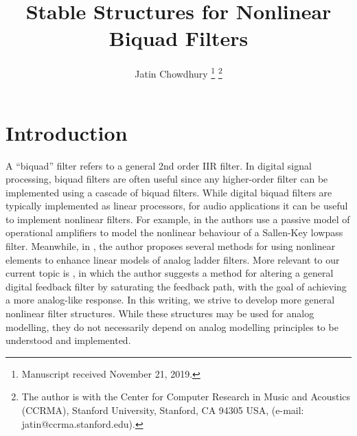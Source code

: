 \documentclass{IEEEtran}
\begin{document}
\title{Stable Structures for Nonlinear Biquad Filters}

\author{Jatin Chowdhury
\thanks{Manuscript received November 21, 2019.}
\thanks{The author is with 
the Center for Computer Research in Music and Acoustics (CCRMA),
Stanford University, Stanford, CA 
94305 USA, (e-mail: jatin@ccrma.stanford.edu).}}



\maketitle
\IEEEdisplaynontitleabstractindextext

\section{Introduction}
A ``biquad'' filter refers to a general 2nd order IIR filter.
In digital signal processing, biquad filters are often useful
since any higher-order filter can be implemented using a cascade
of biquad filters. While digital biquad filters are typically implemented
as linear processors, for audio applications it can be useful to
implement nonlinear filters. For example, in \cite{SKF} the authors
use a passive model of operational amplifiers to model the nonlinear
behaviour of a Sallen-Key lowpass filter. Meanwhile, in \cite{Vadim},
the author proposes several methods for using nonlinear elements
to enhance linear models of analog ladder filters. More relevant to
our current topic is \cite{Rossum1992MakingDF}, in which the author
suggests a method for altering a general digital feedback filter
by saturating the feedback path, with the goal of achieving a more
analog-like response. In this writing, we strive
to develop more general nonlinear filter structures. While these structures
may be used for analog modelling, they do not necessarily depend on analog
modelling principles to be understood and implemented.
\end{document}
